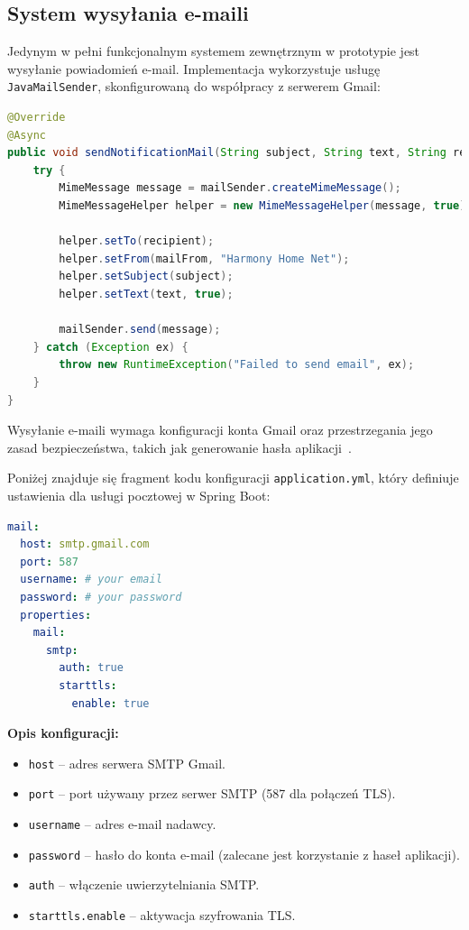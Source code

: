 \subsection{System wysyłania e-maili}

Jedynym w pełni funkcjonalnym systemem zewnętrznym w prototypie jest wysyłanie powiadomień e-mail. Implementacja wykorzystuje usługę \texttt{JavaMailSender}, skonfigurowaną do współpracy z serwerem Gmail:

\begin{lstlisting}[language=Java, caption=Fragment klasy \texttt{MailServiceImp}]
@Override
@Async
public void sendNotificationMail(String subject, String text, String recipient) {
    try {
        MimeMessage message = mailSender.createMimeMessage();
        MimeMessageHelper helper = new MimeMessageHelper(message, true);

        helper.setTo(recipient);
        helper.setFrom(mailFrom, "Harmony Home Net");
        helper.setSubject(subject);
        helper.setText(text, true);

        mailSender.send(message);
    } catch (Exception ex) {
        throw new RuntimeException("Failed to send email", ex);
    }
}
\end{lstlisting}

Wysyłanie e-maili wymaga konfiguracji konta Gmail oraz przestrzegania jego zasad bezpieczeństwa, takich jak generowanie hasła aplikacji~\cite{gmail_api}.

Poniżej znajduje się fragment kodu konfiguracji \texttt{application.yml}, który definiuje ustawienia dla usługi pocztowej w Spring Boot:

\begin{lstlisting}[language=YAML, caption=Fragment konfiguracji poczty w \texttt{application.yml}]
mail:
  host: smtp.gmail.com
  port: 587
  username: # your email
  password: # your password
  properties:
    mail:
      smtp:
        auth: true
        starttls:
          enable: true
\end{lstlisting}

\textbf{Opis konfiguracji:}
\begin{itemize}
    \item \texttt{host} -- adres serwera SMTP Gmail.
    \item \texttt{port} -- port używany przez serwer SMTP (587 dla połączeń TLS).
    \item \texttt{username} -- adres e-mail nadawcy.
    \item \texttt{password} -- hasło do konta e-mail (zalecane jest korzystanie z haseł aplikacji).
    \item \texttt{auth} -- włączenie uwierzytelniania SMTP.
    \item \texttt{starttls.enable} -- aktywacja szyfrowania TLS.
\end{itemize}

